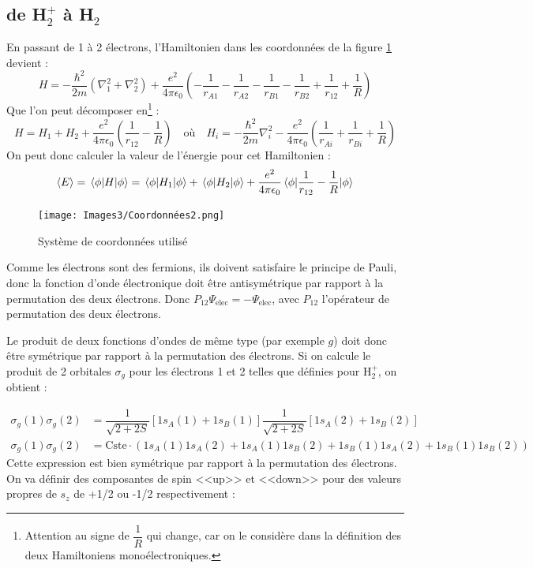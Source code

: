 \subsection{de \textnormal{H}$_2^+$ à \textnormal{H}$_2$}


En passant de 1 à 2 électrons, l'Hamiltonien dans les coordonnées de la figure \ref{fig:Coor} devient :
\[
H = -\dfrac{\hbar^2}{2m}(\nabla^2_1+\nabla^2_2) + \dfrac{e^2}{4\pi\epsilon_0}\left(-\dfrac{1}{r_{A1}}-\dfrac{1}{r_{A2}}-\dfrac{1}{r_{B1}}-\dfrac{1}{r_{B2}}+\dfrac{1}{r_{12}}+\dfrac{1}{R}\right)
\]
Que l'on peut décomposer en\footnote{Attention au signe de $\dfrac{1}{R}$ qui change, car on le considère dans la définition des deux Hamiltoniens monoélectroniques.} :
\[
H = H_1 + H_2 +\dfrac{e^2}{4\pi\epsilon_0}\left(\dfrac{1}{r_{12}}-\dfrac{1}{R}\right) \quad \textrm{où} \quad H_i = -\dfrac{\hbar^2}{2m}\nabla^2_i - \dfrac{e^2}{4\pi\epsilon_0}\left(\dfrac{1}{r_{Ai}}+\dfrac{1}{r_{Bi}}+\dfrac{1}{R}\right)
\]
On peut donc calculer la valeur de l'énergie pour cet Hamiltonien :
\[
\langle E \rangle = \mel{\phi}{H}{\phi} = \mel{\phi}{H_1}{\phi} + \mel{\phi}{H_2}{\phi} + \dfrac{e^2}{4\pi\epsilon_0}\mel{\phi}{\dfrac{1}{r_{12}}-\dfrac{1}{R}}{\phi}
\]
\begin{figure}[htpb]
\centering
\texttt{[image: Images3/Coordonnées2.png]}
\caption{Système de coordonnées utilisé}
\label{fig:Coor}
\end{figure}
Comme les électrons sont des fermions, ils doivent satisfaire le principe de Pauli, donc la fonction d'onde électronique doit être antisymétrique par rapport à la permutation des deux électrons. Donc $P_{12}\Psi_\text{elec} = -\Psi_\text{elec}$, avec $P_{12}$ l'opérateur de permutation des deux électrons.

Le produit de deux fonctions d'ondes de même type (par exemple $g$) doit donc être symétrique par rapport à la permutation des électrons. Si on calcule le produit de 2 orbitales $\sigma_g$ pour les électrons 1 et 2 telles que définies pour H$^+_2$, on obtient :

\begin{align*}
    \sigma_g(1)\sigma_g(2) &= \dfrac{1}{\sqrt{2+2S}}[1s_A(1)+1s_B(1)] \dfrac{1}{\sqrt{2+2S}}[1s_A(2)+1s_B(2)]\\
    \sigma_g(1)\sigma_g(2) &= \text{Cste} \cdot (1s_A(1)1s_A(2)+1s_A(1)1s_B(2)+1s_B(1)1s_A(2)+1s_B(1)1s_B(2))
\end{align*}
Cette expression est bien symétrique par rapport à la permutation des électrons. On va définir des composantes de spin <<up>> et <<down>> pour des valeurs propres de $s_z$ de +1/2 ou -1/2 respectivement :

